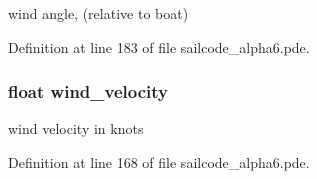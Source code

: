 wind angle, (relative to boat) 



\-Definition at line 183 of file sailcode\-\_\-alpha6.\-pde.

\hypertarget{group__group1_ga641fd5e4834deb5465b1931b7645457d}{
\subsubsection[{wind\-\_\-velocity}]{\setlength{\rightskip}{0pt plus 5cm}float {\bf wind\-\_\-velocity}}}
\label{group__group1_ga641fd5e4834deb5465b1931b7645457d}


wind velocity in knots 



\-Definition at line 168 of file sailcode\-\_\-alpha6.\-pde.

